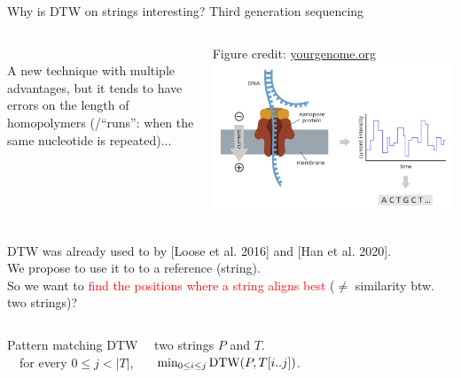 \begin{frame}{Why is DTW on strings interesting? Third generation sequencing}
    \small \pause
    \vspace{-0.5cm}
    \begin{columns}
        \smallskip
        \\
        \smallskip
        A new technique with multiple advantages, but it tends to have errors on the length of homopolymers (/``runs'': when the same nucleotide is repeated)...
        \begin{center}
            {\tiny Figure credit: \href{https://www.yourgenome.org/facts/what-is-oxford-nanopore-technology-ont-sequencing/}{yourgenome.org}}
            \includegraphics[scale=0.15]{figures/ont-sequencing_yourgenome.png}\\
        \end{center}
    \end{columns}\pause

    { DTW  was already used to  by [Loose et al. 2016] and [Han et al. 2020].\\ \pause
    We propose to use it to  to a reference (string).\\ \pause
    So we want to \textcolor{red}{find the positions where a string aligns best} ($\neq$ similarity btw. two strings)?}


    \begin{columns}
    \begin{mydefblock}{Pattern matching DTW}
        ~~two strings $P$ and $T$.\\ 
        ~~for every $0 \leq j < |T|$, 
        ~~~$\min_{0 \leq i \leq j} \mathrm{DTW}(P,T[i..j])$.
    \end{mydefblock}
    

\end{columns}
\end{frame}
